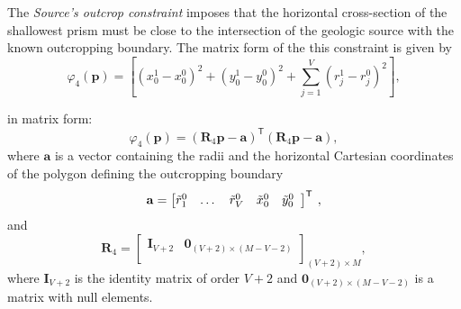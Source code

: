 The \textit{Source’s outcrop constraint} imposes that the horizontal cross-section of the shallowest prism 
must be close to the intersection of the geologic source with the known outcropping boundary. 
The matrix form of the this constraint is given by
\begin{equation}\label{eq:phi4_sum}
\varphi_{4}(\mathbf{p}) = \left[\left(x_{0}^{1} - x_{0}^{0}\right)^2 + \left(y_{0}^{1} - y_{0}^{0}\right)^2 + \sum\limits^{V}_{j=1}\left(r^{1}_{j}-r^{0}_{j}\right)^2\right] ,
\end{equation}

in matrix form:
\begin{equation}\label{eq:phi4}
\varphi_{4}(\mathbf{p}) = \left(\mathbf{R}_{4} \mathbf{p} - \mathbf{a} \right)^{\mathsf{T}} 
\left(\mathbf{R}_{4} \mathbf{p} - \mathbf{a} \right) ,
\end{equation}
where $\mathbf{a}$ is a vector containing the radii and the horizontal Cartesian coordinates of the 
polygon defining the outcropping boundary
\begin{equation}
\mathbf{a} = \left[ \begin{array}{@{}*{12}{c}@{}}
\tilde{r}_{1}^{0} & \dots & \tilde{r}_{V}^{0} & \tilde{x}_{0}^{0} & \tilde{y}_{0}^{0} \\
\end{array} \right]^{\mathsf{T}} \: ,
\label{eq:a-vector}
\end{equation}
and
\begin{equation}
\mathbf{R}_{4} = 
\begin{bmatrix}
\mathbf{I}_{V+2} & \mathbf{0}_{(V+2) \times (M-V-2)} \\
\end{bmatrix}_{(V+2)\times M},
\label{eq:R4-matrix}
\end{equation}
where $\mathbf{I}_{V+2}$ is the identity matrix of order $V+2$ and $\mathbf{0}_{(V+2) \times (M-V-2)}$ is a matrix 
with null elements.

